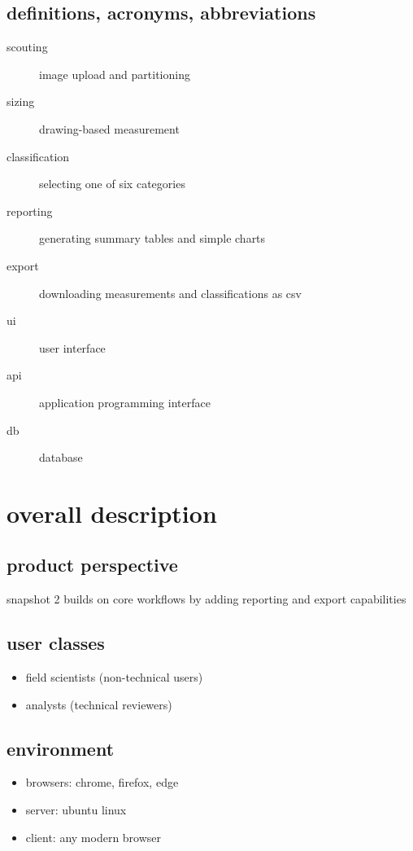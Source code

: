 \documentclass{article}
\begin{document}
\subsection{definitions, acronyms, abbreviations}
\begin{description}
  \item[scouting] image upload and partitioning
  \item[sizing] drawing-based measurement
  \item[classification] selecting one of six categories
  \item[reporting] generating summary tables and simple charts
  \item[export] downloading measurements and classifications as csv
  \item[ui] user interface
  \item[api] application programming interface
  \item[db] database
\end{description}

\section{overall description}
\subsection{product perspective}
snapshot 2 builds on core workflows by adding reporting and export capabilities

\subsection{user classes}
\begin{itemize}
  \item field scientists (non-technical users)
  \item analysts (technical reviewers)
\end{itemize}

\subsection{environment}
\begin{itemize}
  \item browsers: chrome, firefox, edge
  \item server: ubuntu linux
  \item client: any modern browser
\end{itemize}
\end{document}
